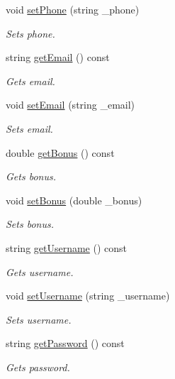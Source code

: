 \begin{DoxyCompactItemize}
void \hyperlink{classCustomer_a84e30f04f40a6ef54ec223756b0a59bf}{set\+Phone} (string \+\_\+phone)
\begin{DoxyCompactList}\small\item\em Sets phone. \end{DoxyCompactList}\item 
string \hyperlink{classCustomer_a9b208d8ac46f8fd1dc5f332a76053cac}{get\+Email} () const 
\begin{DoxyCompactList}\small\item\em Gets email. \end{DoxyCompactList}\item 
void \hyperlink{classCustomer_aff04d3f21f7546c394d28f7b42994719}{set\+Email} (string \+\_\+email)
\begin{DoxyCompactList}\small\item\em Sets email. \end{DoxyCompactList}\item 
double \hyperlink{classCustomer_aac2333a5e45561cdc22d2aa6716c0985}{get\+Bonus} () const 
\begin{DoxyCompactList}\small\item\em Gets bonus. \end{DoxyCompactList}\item 
void \hyperlink{classCustomer_af983714f01880a3f082c60443fcea84d}{set\+Bonus} (double \+\_\+bonus)
\begin{DoxyCompactList}\small\item\em Sets bonus. \end{DoxyCompactList}\item 
string \hyperlink{classCustomer_a1239d270135d75ee010f9775b07e2aa0}{get\+Username} () const 
\begin{DoxyCompactList}\small\item\em Gets username. \end{DoxyCompactList}\item 
void \hyperlink{classCustomer_ab794d5fb843d86eeb79c79dab75302f6}{set\+Username} (string \+\_\+username)
\begin{DoxyCompactList}\small\item\em Sets username. \end{DoxyCompactList}\item 
string \hyperlink{classCustomer_a452b009754c24527545ed040a9bedb0b}{get\+Password} () const 
\begin{DoxyCompactList}\small\item\em Gets password. \end{DoxyCompactList}\item 

\end{DoxyCompactItemize}
